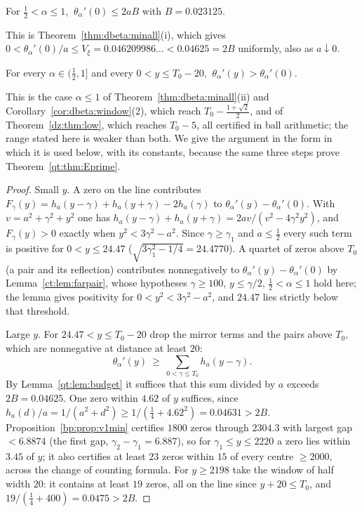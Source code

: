 \begin{lemma}[Budget]\label{qt:lem:budget}
For $\tfrac12<\alpha\le1$, $\ \theta_\alpha'(0)\le2aB$ with $B=0.023125$.
\end{lemma}

This is Theorem~\ref{thm:dbeta:minall}(i), which gives $0<\theta_\alpha'(0)/a\le V_\xi=0.046209986\ldots<0.04625=2B$ uniformly, also as $a\downarrow0$.

\begin{theorem}\label{qt:thm:E}
For every $\alpha\in(\tfrac12,1]$ and every $0<y\le T_0-20$, $\ \theta_\alpha'(y)>\theta_\alpha'(0)$.
\end{theorem}

This is the case $\alpha\le1$ of Theorem~\ref{thm:dbeta:minall}(ii) and Corollary~\ref{cor:dbeta:window}(2), which reach $T_0-\tfrac{1+\sqrt2}2$, and of Theorem~\ref{dz:thm:low}, which reaches $T_0-5$, all certified in ball arithmetic; the range stated here is weaker than both. We give the argument in the form in which it is used below, with its constants, because the same three steps prove Theorem~\ref{qt:thm:Eprime}.

\begin{proof}
Small $y$. A zero on the line contributes $F_\gamma(y)=h_a(y-\gamma)+h_a(y+\gamma)-2h_a(\gamma)$ to $\theta_\alpha'(y)-\theta_\alpha'(0)$. With $v=a^2+\gamma^2+y^2$ one has $h_a(y-\gamma)+h_a(y+\gamma)=2av/(v^2-4\gamma^2y^2)$, and $F_\gamma(y)>0$ exactly when $y^2<3\gamma^2-a^2$. Since $\gamma\ge\gamma_1$ and $a\le\tfrac12$ every such term is positive for $0<y\le24.47$ ($\sqrt{3\gamma_1^2-1/4}=24.4770$). A quartet of zeros above $T_0$ (a pair and its reflection) contributes nonnegatively to $\theta_\alpha'(y)-\theta_\alpha'(0)$ by Lemma~\ref{ct:lem:farpair}, whose hypotheses $\gamma\ge100$, $y\le\gamma/2$, $\tfrac12<\alpha\le1$ hold here; the lemma gives positivity for $0<y^2<3\gamma^2-a^2$, and $24.47$ lies strictly below that threshold.

Large $y$. For $24.47<y\le T_0-20$ drop the mirror terms and the pairs above $T_0$, which are nonnegative at distance at least $20$:
\[
\theta_\alpha'(y)\ \ge\ \sum_{0<\gamma\le T_0}h_a(y-\gamma).
\]
By Lemma~\ref{qt:lem:budget} it suffices that this sum divided by $a$ exceeds $2B=0.04625$. One zero within $4.62$ of $y$ suffices, since $h_a(d)/a=1/(a^2+d^2)\ge1/(\tfrac14+4.62^2)=0.04631>2B$. Proposition~\ref{bp:prop:v1min} certifies $1800$ zeros through $2304.3$ with largest gap $<6.8874$ (the first gap, $\gamma_2-\gamma_1=6.887$), so for $\gamma_1\le y\le2220$ a zero lies within $3.45$ of $y$; it also certifies at least $23$ zeros within $15$ of every centre $\ge2000$, across the change of counting formula. For $y\ge2198$ take the window of half width $20$: it contains at least $19$ zeros, all on the line since $y+20\le T_0$, and $19/(\tfrac14+400)=0.0475>2B$.
\end{proof}

